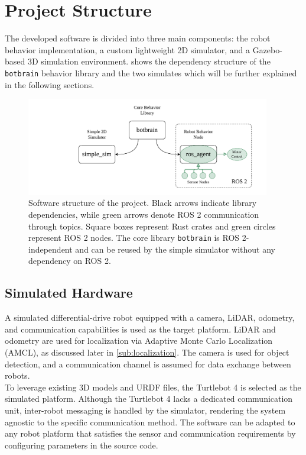 \section{Project Structure}
The developed software is divided into three main components: the robot behavior implementation, a custom lightweight 2D simulator, and a Gazebo-based 3D simulation environment.  shows the dependency structure of the \texttt{botbrain} behavior library and the two simulates which will be further explained in the following sections.

\begin{figure}[H]
    \begin{center}
        \includegraphics[width=0.95\textwidth]{figures/software-structure.pdf}
    \end{center}
    \caption{Software structure of the project. Black arrows indicate library dependencies, while green arrows denote ROS 2 communication through topics. Square boxes represent Rust crates and green circles represent ROS 2 nodes. The core library \texttt{botbrain} is ROS 2-independent and can be reused by the simple simulator without any dependency on ROS 2.}
    \label{fig:software-structure}
\end{figure}

\subsection{Simulated Hardware}
A simulated differential-drive robot equipped with a camera, LiDAR, odometry, and communication capabilities is used as the target platform. LiDAR and odometry are used for localization via Adaptive Monte Carlo Localization (AMCL), as discussed later in \cref{sub:localization}. The camera is used for object detection, and a communication channel is assumed for data exchange between robots.\\

To leverage existing 3D models and URDF files, the Turtlebot 4 \cite{tb4} is selected as the simulated platform. Although the Turtlebot 4 lacks a dedicated communication unit, inter-robot messaging is handled by the simulator, rendering the system agnostic to the specific communication method. The software can be adapted to any robot platform that satisfies the sensor and communication requirements by configuring parameters in the source code.

